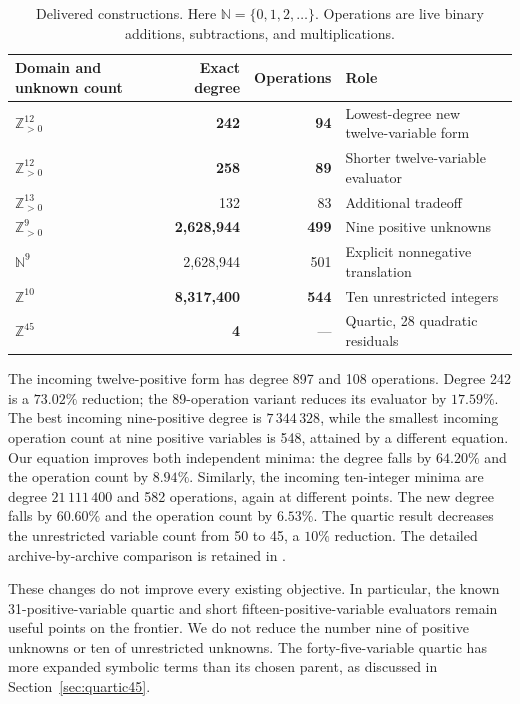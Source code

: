 \documentclass[11pt,a4paper]{article}
\newcommand{\N}{\mathbb N}
\newcommand{\Z}{\mathbb Z}
\newcommand{\Pos}{\mathbb Z_{>0}}
\theoremstyle{definition}
\begin{document}
\begin{table}[ht]
\centering\small
\begin{tabular}{@{}lrrl@{}}
\toprule
Domain and unknown count & Exact degree & Operations & Role\\
\midrule
\(\Pos^{12}\) & \textbf{242} & \textbf{94} & Lowest-degree new twelve-variable form\\
\(\Pos^{12}\) & \textbf{258} & \textbf{89} & Shorter twelve-variable evaluator\\
\(\Pos^{13}\) & 132 & 83 & Additional tradeoff\\
\(\Pos^9\) & \textbf{2,628,944} & \textbf{499} & Nine positive unknowns\\
\(\N^9\) & 2,628,944 & 501 & Explicit nonnegative translation\\
\(\Z^{10}\) & \textbf{8,317,400} & \textbf{544} & Ten unrestricted integers\\
\(\Z^{45}\) & \textbf{4} & --- & Quartic, 28 quadratic residuals\\
\bottomrule
\end{tabular}
\caption{Delivered constructions.  Here \(\N=\{0,1,2,\ldots\}\).
Operations are live binary additions, subtractions, and multiplications.}
\label{tab:results}
\end{table}

The incoming twelve-positive form has degree 897 and 108 operations.
Degree 242 is a \(73.02\%\) reduction; the 89-operation variant reduces
its evaluator by \(17.59\%\).  The best incoming nine-positive degree is
\(7\,344\,328\), while the smallest incoming operation count at nine
positive variables is 548, attained by a different equation.  Our equation
improves both independent minima: the degree falls by \(64.20\%\) and
the operation count by \(8.94\%\).  Similarly, the incoming ten-integer
minima are degree \(21\,111\,400\) and 582 operations, again at different
points.  The new degree falls by \(60.60\%\) and the operation count by
\(6.53\%\).  The quartic result decreases the unrestricted variable count
from 50 to 45, a \(10\%\) reduction.  The detailed archive-by-archive
comparison is retained in .

These changes do not improve every existing objective.  In particular,
the known 31-positive-variable quartic and short fifteen-positive-variable
evaluators remain useful points on the frontier.  We do not reduce the
number nine of positive unknowns or ten of unrestricted unknowns.  The
forty-five-variable quartic has more expanded symbolic terms than its
chosen parent, as discussed in Section~\ref{sec:quartic45}.
\end{document}
